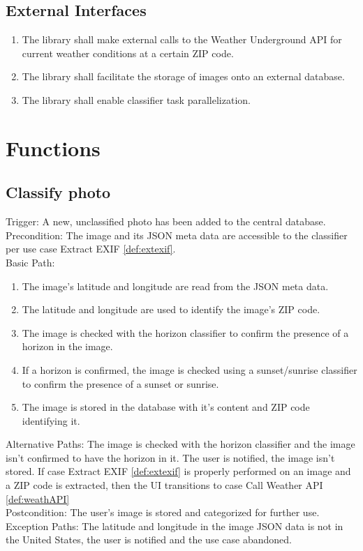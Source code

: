 \documentclass[journal,10pt,draftclsnofoot,onecolumn]{IEEEtran}
\begin{document}
\begin{singlespace}
	\subsection{External Interfaces}
		\begin{enumerate}
			\item The library shall make external calls to the Weather Underground API \cite{api_weather_underground} for current weather conditions at a certain ZIP code.
			\item The library shall facilitate the storage of images onto an external database.
			\item The library shall enable classifier task parallelization.
		\end{enumerate}
\clearpage

\section{Functions}
	\subsection{Classify photo} \label{def:classPh}
		Trigger: A new, unclassified photo has been added to the central database.\\
		Precondition: The image and its JSON meta data are accessible to the classifier per use case Extract EXIF \ref{def:extexif}.\\
		Basic Path:
		\begin{enumerate}
			\item The image's latitude and longitude are read from the JSON meta data.
			\item The latitude and longitude are used to identify the image's ZIP code.
			\item The image is checked with the horizon classifier to confirm the presence of a horizon in the image.
			\item If a horizon is confirmed, the image is checked using a sunset/sunrise classifier to confirm the presence of a sunset or sunrise.
			\item The image is stored in the database with it's content and ZIP code identifying it.
		\end{enumerate}
		Alternative Paths: The image is checked with the horizon classifier and the image isn't confirmed to have the horizon in it. The user is notified, the image isn't stored. If case Extract EXIF \ref{def:extexif} is properly performed on an image and a ZIP code is extracted, then the UI transitions to case Call Weather API \ref{def:weathAPI}\\
		Postcondition: The user's image is stored and categorized for further use.\\
		Exception Paths: The latitude and longitude in the image JSON data is not in the United States, the user is notified and the use case abandoned.
	

\end{singlespace}
\end{document}
